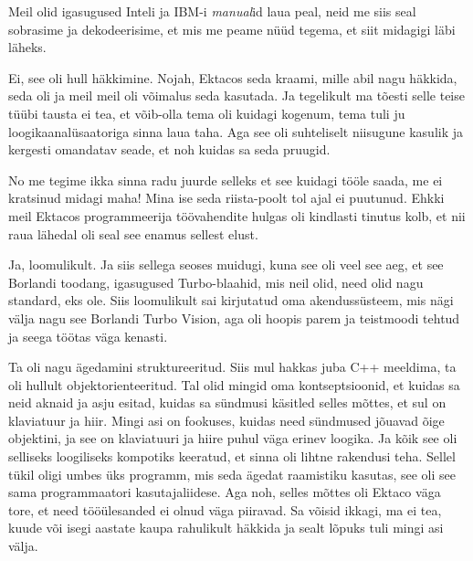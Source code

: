 Meil olid igasugused Inteli ja IBM-i \emph{manual}id laua peal, neid me siis 
seal sobrasime ja dekodeerisime, et mis me peame nüüd tegema, et siit 
midagigi läbi läheks. 



Ei, see oli hull häkkimine. Nojah, Ektacos seda kraami, mille abil nagu häkkida, 
seda oli ja meil meil oli võimalus seda kasutada. Ja tegelikult ma tõesti selle 
teise tüübi  tausta ei tea, et võib-olla tema oli  kuidagi kogenum, tema tuli 
ju loogikaanalüsaatoriga sinna laua taha. Aga see oli suhteliselt niisugune 
kasulik ja kergesti omandatav seade, et noh kuidas sa seda pruugid. 


No me tegime ikka sinna radu juurde selleks et see kuidagi tööle saada, me ei 
kratsinud midagi maha! Mina ise seda riista-poolt tol ajal ei puutunud. Ehkki 
meil Ektacos programmeerija töövahendite hulgas oli kindlasti tinutus kolb, et 
nii raua lähedal oli seal see enamus sellest elust. 



Ja, loomulikult. Ja siis sellega seoses muidugi, kuna  see oli veel see aeg, et 
 see Borlandi
toodang, igasugused Turbo-blaahid, mis neil olid, need olid nagu  standard, eks 
ole. Siis loomulikult sai kirjutatud oma akendussüsteem, mis nägi välja nagu 
see Borlandi Turbo Vision, aga oli hoopis parem ja teistmoodi tehtud ja seega töötas väga 
kenasti. 


Ta oli nagu ägedamini struktureeritud. Siis mul hakkas juba 
C++  meeldima, ta oli hullult objektorienteeritud. Tal olid 
mingid oma kontseptsioonid, et kuidas sa neid aknaid ja asju  esitad, kuidas sa 
sündmusi käsitled  selles mõttes, et sul on klaviatuur ja hiir. Mingi asi on 
fookuses, kuidas need sündmused jõuavad õige objektini, ja see on  klaviatuuri 
ja hiire puhul väga erinev loogika. Ja kõik see oli selliseks loogiliseks 
kompotiks keeratud, et sinna oli lihtne rakendusi teha. Sellel tükil oligi 
umbes üks programm, mis  seda ägedat raamistiku kasutas, see oli see sama 
programmaatori kasutajaliidese. Aga noh, selles mõttes oli Ektaco väga tore, et 
need tööülesanded ei olnud väga piiravad. Sa võisid ikkagi, ma ei tea, 
kuude või isegi aastate kaupa rahulikult häkkida ja sealt lõpuks tuli mingi asi 
välja. 

